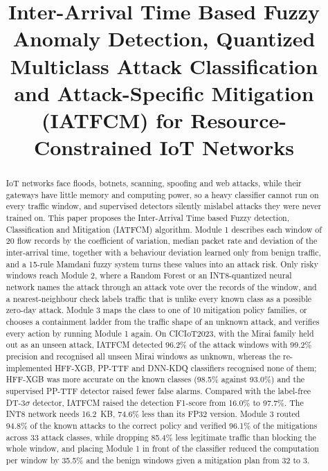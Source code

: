\documentclass[]{interact}
\theoremstyle{plain}
\theoremstyle{definition}
\begin{document}

\title{Inter-Arrival Time Based Fuzzy Anomaly Detection, Quantized Multiclass Attack Classification and Attack-Specific Mitigation (IATFCM) for Resource-Constrained IoT Networks}

\author{
}

\maketitle

\begin{abstract}
IoT networks face floods, botnets, scanning, spoofing and web attacks, while their gateways have little memory and computing power, so a heavy classifier cannot run on every traffic window, and supervised detectors silently mislabel attacks they were never trained on. This paper proposes the Inter-Arrival Time based Fuzzy detection, Classification and Mitigation (IATFCM) algorithm. Module 1 describes each window of 20 flow records by the coefficient of variation, median packet rate and deviation of the inter-arrival time, together with a behaviour deviation learned only from benign traffic, and a 15-rule Mamdani fuzzy system turns these values into an attack risk. Only risky windows reach Module 2, where a Random Forest or an INT8-quantized neural network names the attack through an attack vote over the records of the window, and a nearest-neighbour check labels traffic that is unlike every known class as a possible zero-day attack. Module 3 maps the class to one of 10 mitigation policy families, or chooses a containment ladder from the traffic shape of an unknown attack, and verifies every action by running Module 1 again. On CICIoT2023, with the Mirai family held out as an unseen attack, IATFCM detected 96.2\% of the attack windows with 99.2\% precision and recognised all unseen Mirai windows as unknown, whereas the re-implemented HFF-XGB, PP-TTF and DNN-KDQ classifiers recognised none of them; HFF-XGB was more accurate on the known classes (98.5\% against 93.0\%) and the supervised PP-TTF detector raised fewer false alarms. Compared with the label-free DT-3$\sigma$ detector, IATFCM raised the detection F1-score from 16.0\% to 97.7\%. The INT8 network needs 16.2~KB, 74.6\% less than its FP32 version. Module 3 routed 94.8\% of the known attacks to the correct policy and verified 96.1\% of the mitigations across 33 attack classes, while dropping 85.4\% less legitimate traffic than blocking the whole window, and placing Module 1 in front of the classifier reduced the computation per window by 35.5\% and the benign windows given a mitigation plan from 32 to 3.
\end{abstract}
\end{document}

